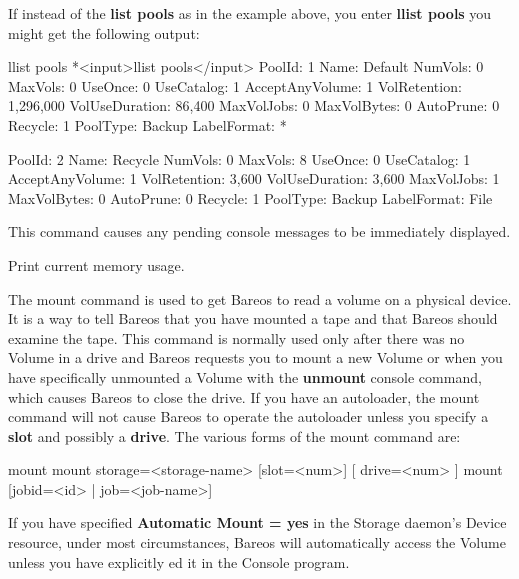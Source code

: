 \begin{description}
   If instead of the {\bf list pools} as in the example above, you enter
   {\bf llist pools} you might get the following output:

\begin{bconsole}{llist pools}
*<input>llist pools</input>
          PoolId: 1
            Name: Default
         NumVols: 0
         MaxVols: 0
         UseOnce: 0
      UseCatalog: 1
 AcceptAnyVolume: 1
    VolRetention: 1,296,000
  VolUseDuration: 86,400
      MaxVolJobs: 0
     MaxVolBytes: 0
       AutoPrune: 0
         Recycle: 1
        PoolType: Backup
     LabelFormat: *

          PoolId: 2
            Name: Recycle
         NumVols: 0
         MaxVols: 8
         UseOnce: 0
      UseCatalog: 1
 AcceptAnyVolume: 1
    VolRetention: 3,600
  VolUseDuration: 3,600
      MaxVolJobs: 1
     MaxVolBytes: 0
       AutoPrune: 0
         Recycle: 1
        PoolType: Backup
     LabelFormat: File
\end{bconsole}

\item [messages]
   This command causes any pending  console messages to be immediately displayed.

\item [memory]
   Print current memory usage.


\item [mount]
   The mount command is used to get Bareos to read a volume on a physical
   device.  It is a way to tell Bareos that you have mounted a tape and
   that Bareos should examine the tape.  This command is normally
   used only after there was no Volume in a drive and Bareos requests you to mount a new
   Volume or when you have specifically unmounted a Volume with the {\bf
   unmount} console command, which causes Bareos to close the drive.  If
   you have an autoloader, the mount command will not cause Bareos to
   operate the autoloader unless you specify a {\bf slot} and possibly a
   {\bf drive}. The various forms of the mount command are:

\begin{bconsole}{mount}
mount  storage=<storage-name> [slot=<num>] [
       drive=<num> ]
mount [jobid=<id> | job=<job-name>]
\end{bconsole}

   If you have specified {\bf Automatic  Mount = yes} in the Storage daemon's
   Device resource,  under most circumstances, Bareos will automatically access
   the Volume unless you have explicitly ed it in  the Console
   program.


\end{description}
